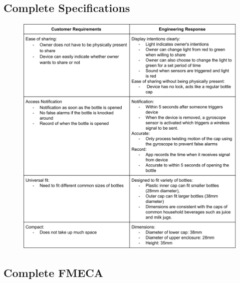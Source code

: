 \documentclass[12pt]{article}
\begin{document}
		\subsection*{Complete Specifications}

		
		\begin{figure}[H]
		\centering
		\includegraphics[width=\textwidth]{specs.png}
		\end{figure}

		\subsection*{Complete FMECA}
\end{document}
